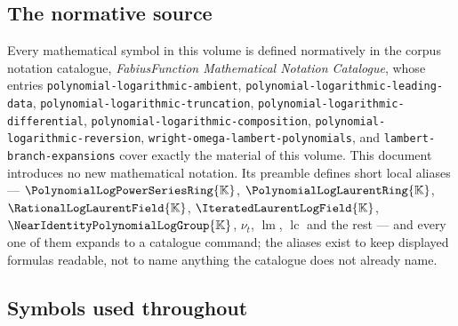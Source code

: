 \documentclass[11pt,oneside]{article}
\theoremstyle{plain}
\theoremstyle{definition}
\theoremstyle{remark}
\newcommand{\K}{\mathbb{K}}
\newcommand{\PLpow}{\PolynomialLogPowerSeriesRing{\K}}   %
\newcommand{\PLlau}{\PolynomialLogLaurentRing{\K}}       %
\newcommand{\PLrat}{\RationalLogLaurentField{\K}}        %
\newcommand{\PLit}{\IteratedLaurentLogField{\K}}         %
\newcommand{\Gnear}{\NearIdentityPolynomialLogGroup{\K}} %
\newcommand{\ordt}{\nu_{t}}                              %
\DeclareMathOperator{\lm}{lm}
\DeclareMathOperator{\lc}{lc}
\begin{document}
\subsection{The normative source}

Every mathematical symbol in this volume is defined normatively in the corpus
notation catalogue, \emph{FabiusFunction Mathematical Notation Catalogue}, whose
entries \texttt{polynomial-logarithmic-ambient},
\texttt{polynomial-logarithmic-leading-data},
\texttt{polynomial-logarithmic-truncation},
\texttt{polynomial-logarithmic-differential},
\texttt{polynomial-logarithmic-composition},
\texttt{polynomial-logarithmic-reversion},
\texttt{wright-omega-lambert-polynomials}, and
\texttt{lambert-branch-expansions} cover exactly the material of this volume.
This document introduces no new mathematical notation.  Its preamble defines
short local aliases --- \(\PLpow\), \(\PLlau\), \(\PLrat\), \(\PLit\),
\(\Gnear\), \(\ordt\), \(\lm\), \(\lc\) and the rest --- and every one of them
expands to a catalogue command; the aliases exist to keep displayed formulas
readable, not to name anything the catalogue does not already name.

\subsection{Symbols used throughout}
\end{document}
